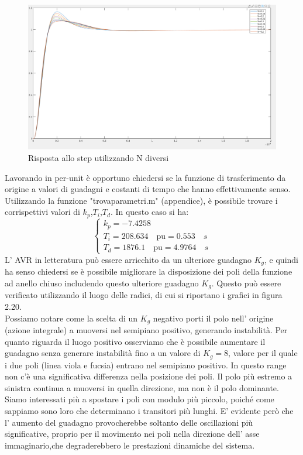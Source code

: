 \documentclass[Lau,noexaminfo]{sapthesis}
\begin{document}
	\begin{figure}[h]
		\centering
		\setlength{\unitlength}{0.27mm}
		\includegraphics[height=0.55\textheight,angle=-90]{vari_N}	 	\caption{Risposta allo step utilizzando N diversi}
	\end{figure}
	Lavorando in per-unit è opportuno chiedersi se la funzione di trasferimento da origine a valori di guadagni e costanti di tempo che hanno effettivamente senso. Utilizzando la funzione "trova\textunderscore parametri.m" (appendice), è possibile trovare i corrispettivi valori di $k_p$,$T_i$,$T_d$. In questo caso si ha:\\
	\[
	\begin{cases}
	k_p=-7.4258\\
	T_i=208.634 \quad\text{pu}=0.553\quad s\\
	T_d=1876.1 \quad \text{pu}=4.9764\quad s
	\end{cases}
	\]
	L' AVR in letteratura può essere arricchito da un ulteriore guadagno $K_g$, e quindi ha senso chiedersi se è possibile migliorare la disposizione dei poli della funzione ad anello chiuso includendo questo ulteriore guadagno $K_g$. Questo può essere verificato utilizzando il luogo delle radici, di cui si riportano i grafici in figura 2.20.\\
	Possiamo notare come la scelta di un $K_g$ negativo porti il polo nell' origine (azione integrale) a muoversi nel semipiano positivo, generando instabilità. Per quanto riguarda il luogo positivo osserviamo che è possibile aumentare il guadagno senza generare instabilità fino a un valore di $K_g=8$, valore per il quale i due poli (linea viola e fucsia) entrano nel semipiano positivo. In questo range non c'è una significativa differenza nella posizione dei poli. Il polo più estremo a sinistra continua a muoversi in quella direzione, ma non è il polo dominante. Siamo interessati più a spostare i poli con modulo più piccolo, poiché come sappiamo sono loro che determinano i transitori più lunghi. E' evidente però che l' aumento del guadagno provocherebbe soltanto delle oscillazioni più significative, proprio per il movimento nei poli nella direzione dell' asse immaginario,che degraderebbero le prestazioni dinamiche del sistema.
\end{document}
